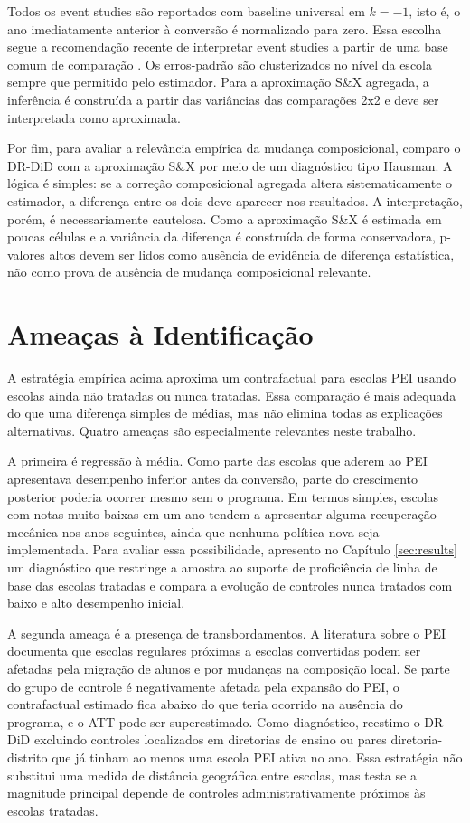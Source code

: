 Todos os event studies são reportados com baseline universal em $k=-1$, isto é, o ano imediatamente anterior à conversão é normalizado para zero. Essa escolha segue a recomendação recente de interpretar event studies a partir de uma base comum de comparação \cite{baker2025, roth_interpreting_2026}. Os erros-padrão são clusterizados no nível da escola sempre que permitido pelo estimador. Para a aproximação S\&X agregada, a inferência é construída a partir das variâncias das comparações 2x2 e deve ser interpretada como aproximada.

Por fim, para avaliar a relevância empírica da mudança composicional, comparo o DR-DiD com a aproximação S\&X por meio de um diagnóstico tipo Hausman. A lógica é simples: se a correção composicional agregada altera sistematicamente o estimador, a diferença entre os dois deve aparecer nos resultados. A interpretação, porém, é necessariamente cautelosa. Como a aproximação S\&X é estimada em poucas células e a variância da diferença é construída de forma conservadora, p-valores altos devem ser lidos como ausência de evidência de diferença estatística, não como prova de ausência de mudança composicional relevante.

\section{Ameaças à Identificação} \label{sec:ameacas_identificacao}

A estratégia empírica acima aproxima um contrafactual para escolas PEI usando escolas ainda não tratadas ou nunca tratadas. Essa comparação é mais adequada do que uma diferença simples de médias, mas não elimina todas as explicações alternativas. Quatro ameaças são especialmente relevantes neste trabalho.

A primeira é regressão à média. Como parte das escolas que aderem ao PEI apresentava desempenho inferior antes da conversão, parte do crescimento posterior poderia ocorrer mesmo sem o programa. Em termos simples, escolas com notas muito baixas em um ano tendem a apresentar alguma recuperação mecânica nos anos seguintes, ainda que nenhuma política nova seja implementada. Para avaliar essa possibilidade, apresento no Capítulo \ref{sec:results} um diagnóstico que restringe a amostra ao suporte de proficiência de linha de base das escolas tratadas e compara a evolução de controles nunca tratados com baixo e alto desempenho inicial.

A segunda ameaça é a presença de transbordamentos. A literatura sobre o PEI documenta que escolas regulares próximas a escolas convertidas podem ser afetadas pela migração de alunos e por mudanças na composição local. Se parte do grupo de controle é negativamente afetada pela expansão do PEI, o contrafactual estimado fica abaixo do que teria ocorrido na ausência do programa, e o ATT pode ser superestimado. Como diagnóstico, reestimo o DR-DiD excluindo controles localizados em diretorias de ensino ou pares diretoria-distrito que já tinham ao menos uma escola PEI ativa no ano. Essa estratégia não substitui uma medida de distância geográfica entre escolas, mas testa se a magnitude principal depende de controles administrativamente próximos às escolas tratadas.

